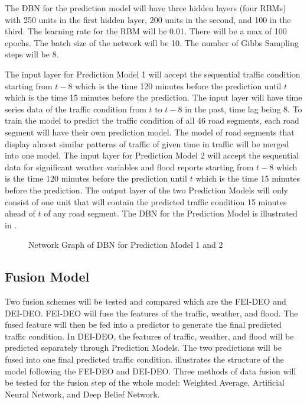 The DBN for the prediction model will have three hidden layers (four RBMs) with 250 units in the first hidden layer, 200 units in the second, and 100 in the third. The learning rate for the RBM will be 0.01. There will be a max of 100 epochs. The batch size of the network will be 10. The number of Gibbs Sampling steps will be 8. 

The input layer for Prediction Model 1 will accept the sequential traffic condition starting from $t-8$ which is the time 120 minutes before the prediction until $t$ which is the time 15 minutes before the prediction. The input layer will have time series data of the traffic condition from $t$ to $t-8$ in the past, time lag being 8. To train the model to predict the traffic condition of all 46 road segments, each road segment will have their own prediction model. The model of road segments that display almost similar patterns of traffic of given time in traffic will be merged into one model. 
The input layer for Prediction Model 2 will accept the sequential data for significant weather variables and flood reports starting from $t-8$ which is the time 120 minutes before the prediction until $t$ which is the time 15 minutes before the prediction.
The output layer of the two Prediction Models will only consist of one unit that will contain the predicted traffic condition 15 minutes ahead of $t$ of any road segment. The DBN for the Prediction Model is illustrated in .

\begin{figure}[ht]
	\centering
	\captionsetup{justification=centering}
	\caption{Network Graph of DBN for Prediction Model 1 and 2}
	\label{fig:dbnpredictor}
\end{figure}

\subsection{Fusion Model}
Two fusion schemes will be tested and compared which are the FEI-DEO and DEI-DEO. FEI-DEO will fuse the features of the traffic, weather, and flood. The fused feature will then be fed into a predictor to generate the final predicted traffic condition. In DEI-DEO, the features of traffic, weather, and flood will be predicted separately through Prediction Models. The two predictions will be fused into one final predicted traffic condition.  illustrates the structure of the model following the FEI-DEO and DEI-DEO.
Three  methods of data fusion will be tested for the fusion step of the whole model: Weighted Average, Artificial Neural Network, and Deep Belief Network. 

